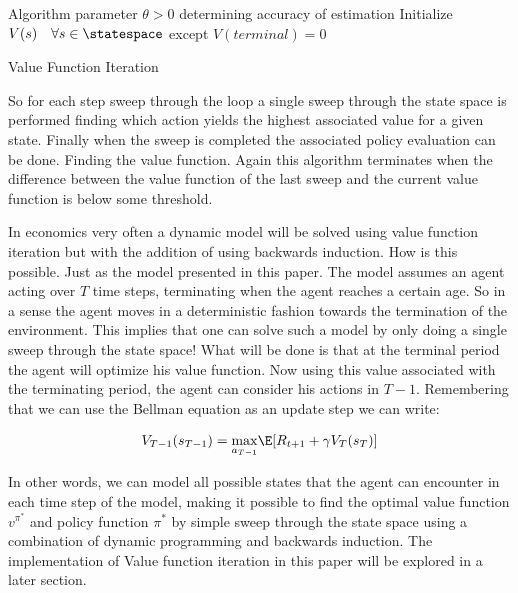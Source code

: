 \begin{algorithm}[H]
\SetAlgoLined
{}
 Algorithm parameter $\theta > 0$ determining accuracy of estimation\;
 Initialize $V(s)\quad \forall s \in \statespace$ except $V(terminal) = 0$\;
 \caption{Value Function Iteration}
\end{algorithm}

 So for each step sweep through the loop a single sweep through the state space is performed finding which action yields the highest associated value for a given state. Finally when the sweep is completed the associated policy evaluation can be done. Finding the value function. Again this algorithm terminates when the difference between the value function of the last sweep and the current value function is below some threshold.
 
 In economics very often a dynamic model will be solved using value function iteration but with the addition of using backwards induction. How is this possible. Just as the model presented in this paper. The model assumes an agent acting over $T$ time steps, terminating when the agent reaches a certain age. So in a sense the agent moves in a deterministic fashion towards the termination of the environment. This implies that one can solve such a model by only doing a single sweep through the state space! What will be done is that at the terminal period the agent will optimize his value function. Now using this value associated with the terminating period, the agent can consider his actions in $T-1$. Remembering that we can use the Bellman equation as an update step we can write:
 
 \begin{equation}
     V_{T-1}(s_{T-1}) = \underset{a_{T-1}}{\max}\E [R_{t+1} + \gamma V_T (s_T)]
 \end{equation}
 
 In other words, we can model all possible states that the agent can encounter in each time step of the model, making it possible to find the optimal value function $v^{\pi^*}$ and policy function $\pi^{*}$ by simple sweep through the state space using a combination of dynamic programming and backwards induction. The implementation of Value function iteration in this paper will be explored in a later section.
 
